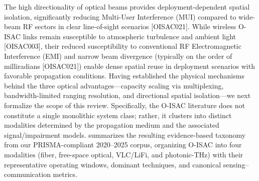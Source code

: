 {}\markdownRendererUlItemEnd 
\markdownRendererUlEndTight \markdownRendererInterblockSeparator
{}
\markdownRendererSectionEnd \markdownRendererSectionBegin
{}\markdownRendererInterblockSeparator
{}The high directionality of optical beams provides deployment-dependent spatial isolation, significantly reducing Multi-User Interference (MUI) compared to wide-beam RF sectors in clear line-of-sight scenarios [O\markdownRendererUnderscore{}ISAC\markdownRendererUnderscore{}021]. While wireless O-ISAC links remain susceptible to atmospheric turbulence and ambient light [O\markdownRendererUnderscore{}ISAC\markdownRendererUnderscore{}003], their reduced susceptibility to conventional RF Electromagnetic Interference (EMI) and narrow beam divergence (typically on the order of milliradians [O\markdownRendererUnderscore{}ISAC\markdownRendererUnderscore{}021]) enable dense spatial reuse in deployment scenarios with favorable propagation conditions.\markdownRendererInterblockSeparator
{}
\markdownRendererSectionEnd 
\markdownRendererSectionEnd \markdownRendererSectionBegin
{}\markdownRendererInterblockSeparator
{}Having established the physical mechanisms behind the three optical advantages—capacity scaling via multiplexing, bandwidth-limited ranging resolution, and directional spatial isolation—we next formalize the scope of this review. Specifically, the O-ISAC literature does not constitute a single monolithic system class; rather, it clusters into distinct modalities determined by the propagation medium and the associated signal/impairment models.  summarizes the resulting evidence-based taxonomy from our PRISMA-compliant 2020–2025 corpus, organizing O-ISAC into four modalities (fiber, free-space optical, VLC/LiFi, and photonic-THz) with their representative operating windows, dominant techniques, and canonical sensing–communication metrics.\markdownRendererParagraphSeparator
